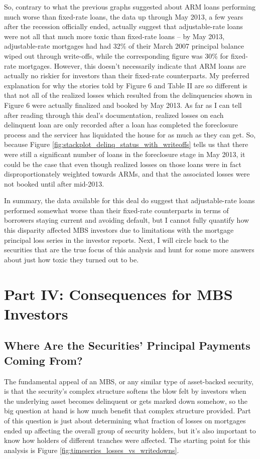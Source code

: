 \documentclass[12pt]{article}
\begin{document}
So, contrary to what the previous graphs suggested about ARM loans performing much worse than fixed-rate loans, the data up through May 2013, a few years after the recession officially ended, actually suggest that adjustable-rate loans were not all that much more toxic than fixed-rate loans – by May 2013, adjustable-rate mortgages had had 32\% of their March 2007 principal balance wiped out through write-offs, while the corresponding figure was 30\% for fixed-rate mortgages. However, this doesn't necessarily indicate that ARM loans are actually no riskier for investors than their fixed-rate counterparts. My preferred explanation for why the stories told by Figure 6 and Table II are so different is that not all of the realized losses which resulted from the delinquencies shown in Figure 6 were actually finalized and booked by May 2013. As far as I can tell after reading through this deal’s documentation, realized losses on each delinquent loan are only recorded after a loan has completed the foreclosure process and the servicer has liquidated the house for as much as they can get. So, because Figure \ref{fig:stackplot_delinq_status_with_writeoffs} tells us that there were still a significant number of loans in the foreclosure stage in May 2013, it could be the case that even though realized losses on those loans were in fact disproportionately weighted towards ARMs, and that the associated losses were not booked until after mid-2013.

In summary, the data available for this deal do suggest that adjustable-rate loans performed somewhat worse than their fixed-rate counterparts in terms of borrowers staying current and avoiding default, but I cannot fully quantify how this disparity affected MBS investors due to limitations with the mortgage principal loss series in the investor reports. Next, I will circle back to the securities that are the true focus of  this analysis and hunt for some more answers about just how toxic they turned out to be.

\section*{Part IV: Consequences for MBS Investors}

\subsection*{Where Are the Securities' Principal Payments Coming From?}

The fundamental appeal of an MBS, or any similar type of asset-backed security, is that the security’s complex structure softens the blow felt by investors when the underlying asset becomes delinquent or gets marked down somehow, so the big question at hand is how much benefit that complex structure provided. Part of this question is just about determining what fraction of losses on mortgages ended up affecting the overall group of security holders, but it’s also important to know how holders of different tranches were affected. The starting point for this analysis is Figure \ref{fig:timeseries_losses_vs_writedowns}.
\end{document}
